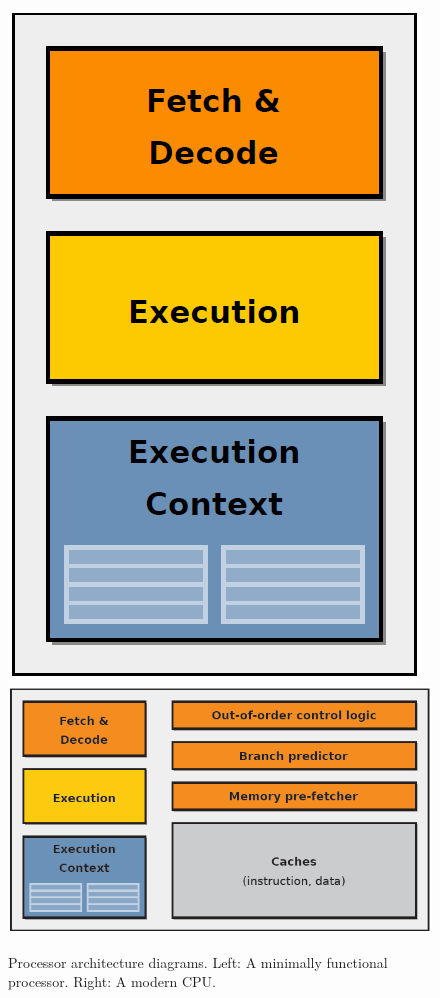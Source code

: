 \begin{figure}
    \includegraphics[height=0.25\paperheight]{CPU_Simple.png}
    \includegraphics[height=0.25\paperheight]{CPU.png}
    \caption{Processor architecture diagrams. Left: A minimally functional processor. Right: A modern CPU. \cite{gpgpu}}
    \label{fig:cpu}
\end{figure}

